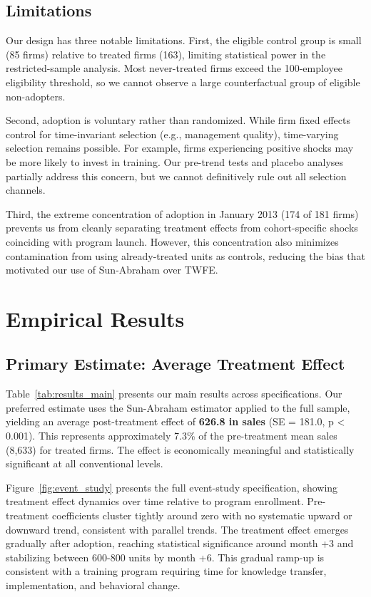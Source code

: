 \documentclass{article}
\begin{document}
\subsection{Limitations}

Our design has three notable limitations. First, the eligible control group is small (85 firms) relative to treated firms (163), limiting statistical power in the restricted-sample analysis. Most never-treated firms exceed the 100-employee eligibility threshold, so we cannot observe a large counterfactual group of eligible non-adopters.

Second, adoption is voluntary rather than randomized. While firm fixed effects control for time-invariant selection (e.g., management quality), time-varying selection remains possible. For example, firms experiencing positive shocks may be more likely to invest in training. Our pre-trend tests and placebo analyses partially address this concern, but we cannot definitively rule out all selection channels.

Third, the extreme concentration of adoption in January 2013 (174 of 181 firms) prevents us from cleanly separating treatment effects from cohort-specific shocks coinciding with program launch. However, this concentration also minimizes contamination from using already-treated units as controls, reducing the bias that motivated our use of Sun-Abraham over TWFE.

\section{Empirical Results}
\label{sec:results}

\subsection{Primary Estimate: Average Treatment Effect}

Table~\ref{tab:results_main} presents our main results across specifications. Our preferred estimate uses the Sun-Abraham estimator applied to the full sample, yielding an average post-treatment effect of \textbf{626.8 in sales} (SE = 181.0, p < 0.001). This represents approximately 7.3\% of the pre-treatment mean sales (8,633) for treated firms. The effect is economically meaningful and statistically significant at all conventional levels.

Figure~\ref{fig:event_study} presents the full event-study specification, showing treatment effect dynamics over time relative to program enrollment. Pre-treatment coefficients cluster tightly around zero with no systematic upward or downward trend, consistent with parallel trends. The treatment effect emerges gradually after adoption, reaching statistical significance around month +3 and stabilizing between 600-800 units by month +6. This gradual ramp-up is consistent with a training program requiring time for knowledge transfer, implementation, and behavioral change.
\end{document}
